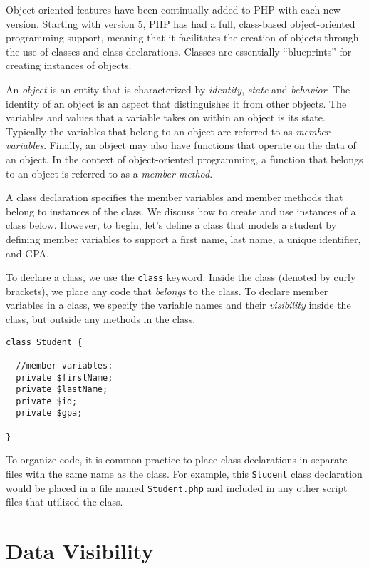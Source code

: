 

Object-oriented features have been continually added to PHP with
each new version.  Starting with version 5, PHP has had a full,
class-based object-oriented programming support, meaning
that it facilitates the creation of objects through the use of classes
and class declarations.  Classes are essentially ``blueprints'' for 
creating instances of objects.  

An \emph{object} is an entity that is characterized by \emph{identity}, 
\emph{state} and \emph{behavior}.  The identity of an object is an
aspect that distinguishes it from other objects.  The variables and
values that a variable takes on within an object is its state.  Typically
the variables that belong to an object are referred to as \emph{member 
variables}.  Finally, an object may also have functions that operate
on the data of an object.  In the context of object-oriented programming, 
a function that belongs to an object is referred to as a \emph{member method}.

A class declaration specifies the member variables and member 
methods that belong to instances of the
class.  We discuss how to create and use instances of a class below.
However, to begin, let's define a class that models a student by
defining member variables to support a first name, last name, a
unique identifier, and GPA.

To declare a class, we use the \texttt{class} keyword.
Inside the class (denoted by curly brackets), we place any code that
\emph{belongs} to the class.  To declare member variables in
a class, we specify the variable names and their \emph{visibility}
inside the class, but outside any methods in the class.

\begin{verbatim}
class Student {

  //member variables:
  private $firstName;
  private $lastName;
  private $id;
  private $gpa;

}
\end{verbatim}

To organize code, it is common practice to place class declarations in
separate files with the same name as the class.  For example, this
\texttt{Student} class declaration would be placed in a 
file named \texttt{Student.php} and included in any other
script files that utilized the class.

\section{Data Visibility}

